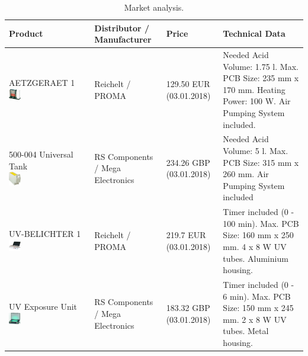 \begin{table}[H]
\centering 
\begin{tabular}{p{} p{} p{} 
p{} } 
\textbf{Product}&
\textbf{Distributor / Manufacturer}&
\textbf{Price}& 
\textbf{Technical Data}\\\hline

\specialcell[t]{
AETZGERAET 1\\
\includegraphics[width=0.15\textwidth]{./fig/etching_machine_2}
}&
Reichelt / PROMA&
129.50 EUR (03.01.2018)&
Needed Acid Volume: 1.75 l. Max. PCB Size: 235 mm x 170 mm. Heating Power: 100 W. Air Pumping System included.\\ 

\specialcell[t]{
500-004 Universal Tank\\
\includegraphics[width=0.15\textwidth]{./fig/etching_machine_1}
}&
RS Components / Mega Electronics&
234.26 GBP (03.01.2018)&
Needed Acid Volume: 5 l. Max. PCB Size: 315 mm x 260 mm. Air Pumping System included\\\hline

\specialcell[t]{
UV-BELICHTER 1\\
\includegraphics[width=0.15\textwidth]{./fig/uv_light_1}
}&
Reichelt / PROMA&
219.7 EUR (03.01.2018)&
Timer included (0 - 100 min). Max. PCB Size: 160 mm x 250 mm. 4 x 8 W \gls{UV} tubes. Aluminium housing.\\

\specialcell[t]{
UV Exposure Unit\\
\includegraphics[width=0.15\textwidth]{./fig/uv_light_2}
}&
RS Components / Mega Electronics&
183.32 GBP (03.01.2018)&
Timer included (0 - 6 min). Max. PCB Size: 150 mm x 245 mm. 2 x 8 W \gls{UV} tubes. Metal housing.\\

\hline
\end{tabular}
\caption{Market analysis.}
\label{tab:marketanalysis}
\end{table}

